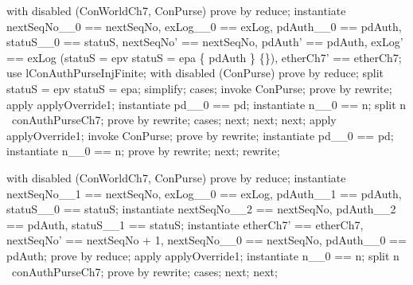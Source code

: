 \begin{LPScript}\begin{zproof}[tConcAbortOkayPRE]
    with disabled (ConWorldCh7, ConPurse) prove by reduce;
    instantiate nextSeqNo\_\_0 == nextSeqNo, exLog\_\_0 == exLog,
        pdAuth\_\_0 == pdAuth, statuS\_\_0 == statuS,
        nextSeqNo' == nextSeqNo, pdAuth' == pdAuth,
        exLog' == exLog \cup (\IF statuS = epv \lor statuS = epa
            \THEN \{ pdAuth \} \ELSE \{\}),
        etherCh7' == etherCh7;
    use lConAuthPurseInjFinite;
    with disabled (ConPurse) prove by reduce;
    split statuS = epv \lor statuS = epa;
    simplify;
    cases;
        invoke ConPurse;
        prove by rewrite;
        apply applyOverride1;
        instantiate pd\_\_0 == pd;
        instantiate n\_\_0 == n;
        split n \in \dom~conAuthPurseCh7;
        prove by rewrite;
    cases;
    next;
    next;
    next;
        apply applyOverride1;
        invoke ConPurse;
        prove by rewrite;
        instantiate pd\_\_0 == pd;
        instantiate n\_\_0 == n;
        prove by rewrite;
    next;
    rewrite;
\end{zproof}\end{LPScript}

\begin{LPScript}\begin{zproof}[tConcStartFromOkayPRE]
    with disabled (ConWorldCh7, ConPurse) prove by reduce;
    instantiate nextSeqNo\_\_1 == nextSeqNo,
        exLog\_\_0 == exLog, pdAuth\_\_1 == pdAuth,
        statuS\_\_0 == statuS;
    instantiate nextSeqNo\_\_2 == nextSeqNo,
        pdAuth\_\_2 == pdAuth, statuS\_\_1 == statuS;
    instantiate etherCh7' == etherCh7, nextSeqNo' == nextSeqNo + 1,
        nextSeqNo\_\_0 == nextSeqNo, pdAuth\_\_0 == pdAuth;
    prove by reduce;
    apply applyOverride1;
    instantiate n\_\_0 == n;
    split n \in \dom~conAuthPurseCh7;
    prove by rewrite;
    cases;
    next;
    next;
\end{zproof}\end{LPScript}


